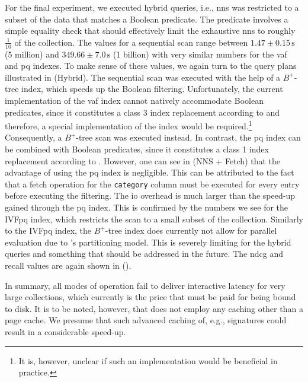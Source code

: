 For the final experiment, we executed hybrid queries, i.e., \acrshort{nns} was restricted to a subset of the data that matches a Boolean predicate. The predicate involves a simple equality check that should effectively limit the exhaustive \acrshort{nns} to roughly $\frac{1}{10}$ of the collection. The values for a sequential scan range between $1.47 \pm 0.15 \, \si{\second}$ (5 million) and $349.66 \pm 7.0 \, \si{\second}$ (1 billion) with very similar numbers for the \acrshort{vaf} and \acrshort{pq} indexes. To make sense of these values, we again turn to the query plans illustrated in  (Hybrid). The sequential scan was executed with the help of a $B^{+}$-tree index, which speeds up the Boolean filtering. Unfortunately, the current implementation of the \acrshort{vaf} index cannot natively accommodate Boolean predicates, since it constitutes a class 3 index replacement according to  and therefore, a special implementation of the index would be required.\footnote{It is, however, unclear if such an implementation would be beneficial in practice.} Consequently, a $B^{+}$-tree scan was executed instead. In contrast, the \acrshort{pq} index can be combined with Boolean predicates, since it constitutes a class 1 index replacement according to . However, one can see in  (NNS + Fetch) that the advantage of using the \acrshort{pq} index is negligible.
This can be attributed to the fact that a fetch operation for the \texttt{category} column must be executed for every entry before executing the filtering. The \acrshort{io} overhead is much larger than the speed-up gained through the \acrshort{pq} index. This is confirmed by the numbers we see for the IVF\acrshort{pq} index, which restricts the scan to a small subset of the collection. Similarly to the IVF\acrshort{pq} index, the $B^{+}$-tree index does currently not allow for parallel evaluation due to \cottontail{}'s partitioning model. This is severely limiting for the hybrid queries and something that should be addressed in the future. The \acrshort{ndcg} and recall values are again shown in  ().

In summary, all modes of operation fail to deliver interactive latency for very large collections, which currently is the price that must be paid for being bound to disk. It is to be noted, however, that \cottontail{} does not employ any caching other than a page cache. We presume that such advanced caching of, e.g., signatures could result in a considerable speed-up.


